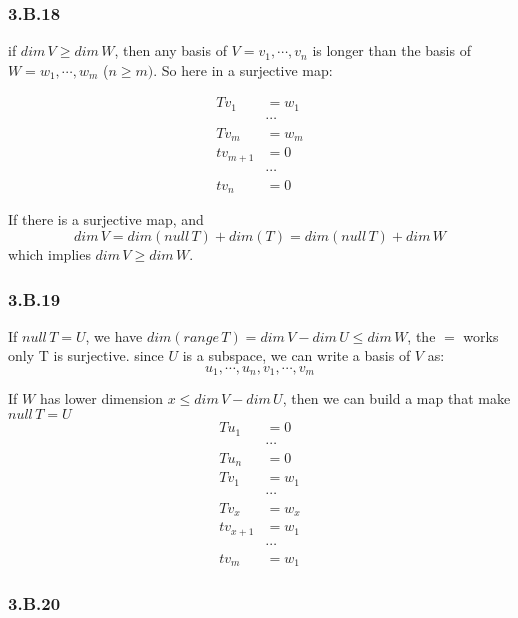 \subsubsection*{3.B.18}

if $dim\,V\geq dim\,W$, then any basis of  $V=v_{1},\cdots,v_{n}$ is longer than the basis of $W=w_{1}, \cdots,w_{m}$ ($n\geq m)$. So here in a surjective map:

\begin{equation*}
    \begin{split}
Tv_{1} & = w_{1} \\
& \cdots  \\
Tv_{m} &= w_{m} \\
tv_{m+1} &= 0 \\
&\cdots \\
tv_{n} &= 0
\end{split}
\end{equation*}

If there is a surjective map, and
\[dim\,V = dim(null\,T) + dim(T) = dim(null\, T) + dim\,W\]
which implies $dim\,V\geq dim\,W$.

\subsubsection*{3.B.19}

If $null\,T=U$, we have $dim(range\,T) = dim\,V - dim\,U \leq dim\,W$, the $=$ works only T is surjective.
since $U$ is a subspace, we can write a basis of $V$ as:
\[u_{1}, \cdots, u_{n}, v_{1},\cdots, v_{m}\]

If $W$ has lower dimension $x\leq dim\,V-dim\,U$, then we can build a map that make $null\,T=U$
\begin{equation*}
    \begin{split}
    Tu_{1} &= 0 \\
    & \cdots \\
    Tu_{n} &= 0 \\
Tv_{1} & = w_{1} \\
& \cdots  \\
Tv_{x} &= w_{x} \\
tv_{x+1} &= w_{1} \\
&\cdots \\
tv_{m} &= w_{1}
\end{split}
\end{equation*}

\subsubsection*{3.B.20}

